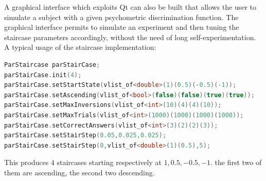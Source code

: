 \documentclass[acmtocl,acmnow]{acmtrans2m}
\begin{document}
A graphical interface which exploits Qt can also be built that allows the user to simulate a subject with a given psychometric discrimination function.
The graphical interface permits to simulate an experiment and then tuning the staircase parameters accordingly, without the need of long self-experimentation.
A typical usage of the staircase implementation:

\begin{lstlisting}[language=C++]
ParStaircase parStairCase;
parStairCase.init(4);
parStairCase.setStartState(vlist_of<double>(1)(0.5)(-0.5)(-1));
parStairCase.setAscending(vlist_of<bool>(false)(false)(true)(true));
parStairCase.setMaxInversions(vlist_of<int>(10)(4)(4)(10));
parStairCase.setMaxTrials(vlist_of<int>(1000)(1000)(1000)(1000));
parStairCase.setCorrectAnswers(vlist_of<int>(3)(2)(2)(3));
parStairCase.setStairStep(0.05,0.025,0.025);
parStairCase.setStairStep(0,vlist_of<double>(1)(0.5),5);
\end{lstlisting}
This produces $4$ staircases starting respectively at $1,0.5,-0.5,-1$. the first two of them are ascending, the second two descending.

%
%
%
\end{document}
